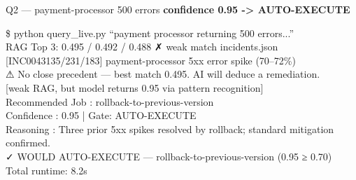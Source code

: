 \begin{frame}{Q2 — payment-processor 500 errors}
  {\color{cteal}\ttfamily\small\bfseries confidence 0.95 -> AUTO-EXECUTE}
  \vspace{0.15cm}
  \begin{terminal}
    \$ python query\_live.py ``payment processor returning 500 errors...''\\

    RAG Top 3: {\color{camber}0.495 / 0.492 / 0.488 ✗ weak match}  incidents.json\\
    \hspace*{0.4cm}[INC0043135/231/183] payment-processor 5xx error spike (70--72\%)\\

    ⚠ No close precedent — best match 0.495. AI will deduce a remediation.\\
    \hspace*{0.4cm}[weak RAG, but model returns 0.95 via pattern recognition]\\

    Recommended Job : {\color{cauto}rollback-to-previous-version}\\
    Confidence      : {\color{cauto}0.95}  |  Gate: {\color{cauto}AUTO-EXECUTE}\\
    Reasoning       : Three prior 5xx spikes resolved by rollback; standard mitigation confirmed.\\

    {\color{cauto}✓ WOULD AUTO-EXECUTE  —  rollback-to-previous-version  (0.95 ≥ 0.70)}\\
    Total runtime: 8.2s
  \end{terminal}
\end{frame}

